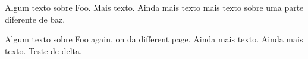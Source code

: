 \documentclass[brazilian, 12pt]{article}
\begin{document}
Algum texto sobre Foo.
Mais texto.
Ainda mais texto
mais texto sobre uma parte diferente de baz.

\clearpage
Algum texto sobre Foo again, on da different page.
Ainda mais texto.
Ainda mais texto.
Teste de delta\index{$\delta$}.

\printindex
\end{document}
